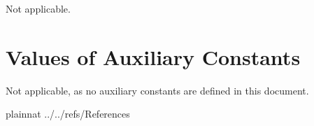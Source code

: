 \documentclass[12pt]{article}
\begin{document}
Not applicable.

\section{Values of Auxiliary Constants}
Not applicable, as no auxiliary constants are defined in this document.

\newpage

 {plainnat}
 {../../refs/References}
%





%
%

%
%
\end{document}
